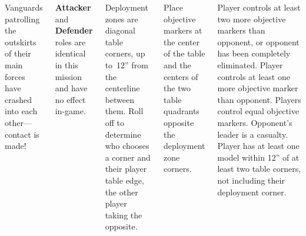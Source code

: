 
\begin{columns}

  Vanguards patrolling the outskirts of their main forces have crashed
  into each other---contact is made!

  \textbf{Attacker} and \textbf{Defender} roles are identical in this
  mission and have no effect in-game.

%


Deployment zones are diagonal table corners, up to~12'' from the
centerline between them.  Roll off to determine who chooses a corner
and their player table edge, the other player taking the opposite.

Place objective markers at the center of the table and the centers of
the two table quadrants opposite the deployment zone corners.

\columnbreak

\scoringbox%
{Player controls at least two more objective markers than opponent, or
  opponent has been completely eliminated.}%
{Player controls at least one more objective marker than opponent.}%
{Players control equal objective markers.}%
{Opponent's leader is a casualty.}%
{Player has at least one model within 12'' of at least two table
  corners, not including their deployment corner.}

\end{columns}
